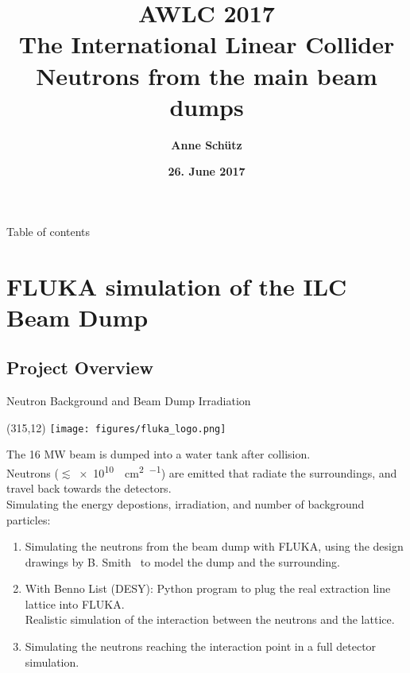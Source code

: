 \documentclass[xcolor={dvipsnames}]{beamer}
\title[Neutrons from the main beam dumps]{\textbf{\alert{AWLC 2017} \\ \vspace*{0.3cm} The International Linear Collider \\ \LARGE Neutrons from the main beam dumps}}
\author{\textbf{Anne Sch\"utz}}
\institute{\textbf{DESY}}
\date{\textbf{26. June 2017}}
\newcommand{\flukalogo}{
  \setlength{\TPHorizModule}{1pt}
  \setlength{\TPVertModule}{1pt}
  \begin{textblock}{1}(315,12)
   \texttt{[image: figures/fluka\_logo.png]}
  \end{textblock}
}
\begin{document}
{
\begin{frame}
  \titlepage
\end{frame}
}

\begin{frame}{Table of contents}
  \tableofcontents
\end{frame}



\section{FLUKA simulation of the ILC Beam Dump}
\subsection{Project Overview}
{
\begin{frame}{Neutron Background and Beam Dump Irradiation}
\flukalogo
The 16 MW beam is dumped into a water tank after collision.\\Neutrons ($\lesssim$\SI{e10}{\per\square\centi\metre\per\year}) are emitted that radiate the surroundings, and travel back towards the detectors.\\
\vspace*{0.1cm}
\alert{Simulating the energy depostions, irradiation, and number of background particles:}
\begin{enumerate}
 \item Simulating the neutrons from the beam dump with FLUKA, using the design drawings by B. Smith~\cite{Smith} to model the dump and the surrounding.
 \item With Benno List (DESY): Python program to plug the real extraction line lattice into FLUKA.\\
Realistic simulation of the interaction between the neutrons and the lattice.
 \item Simulating the neutrons reaching the interaction point in a full detector simulation.
\end{enumerate}
\end{frame}
}

\end{document}
